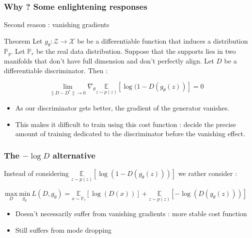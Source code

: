 \documentclass[french,9pt]{beamer}
\begin{document}
\begin{frame}
\frametitle{Why ? Some enlightening responses \cite{arjovsky_towards_2017}}

Second reason : vanishing gradients

\begin{block}{Theorem}
Let $g_{\theta} : \mathcal{Z} \rightarrow \mathcal{X}$ be be a differentiable function that induces a distribution $\mathbb{P}_{g}$. Let $\mathbb{P}_{r}$ be the real data distribution. Suppose that the supports lies in two manifolds that don’t have full dimension and don’t perfectly align. Let $D$ be a differentiable discriminator. Then :

$$\underset{\|D-D^{*}\| \rightarrow 0}{\lim} \nabla_{\theta} \underset{z\sim p(z)}{\mathbb{E}}[\log(1-D(g_{\theta}(z))]=0  $$ 

\end{block}

\pause

\begin{itemize}
\item As our discriminator gets better, the gradient of the generator vanishes.
\item This makes it difficult to train using this cost function : decide the precise amount of training dedicated to the discriminator before the vanishing effect.
\end{itemize}


\end{frame}

\begin{frame}
\frametitle{The $-\log D$ alternative}
Instead of considering $ \underset{z \sim p(z)}{\mathbb{E}}[\log(1-D(g_{\theta}(z)))]$ we rather consider :

\begin{equation}
\label{ganeeqstab}
\underset{D}{\text{max}} \ \underset{g_{\theta}}{\text{min}} \  L(D,g_{\theta}) = \underset{x \sim \mathbb{P}_{r}}{\mathbb{E}}[\log(D(x))]+ \underset{z \sim p(z)}{\mathbb{E}}[-\log(D(g_{\theta}(z)))]
\end{equation}

\begin{itemize}
\item Doesn’t necessarily suffer from vanishing gradients : more stable cost function
\item Still suffers from mode dropping
\end{itemize}


\end{frame}
\end{document}
